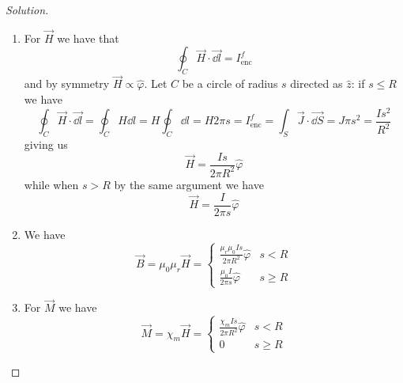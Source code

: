\documentclass[12pt]{extarticle}
\begin{document}
\begin{proof}[Solution]

    \skiplineafterproof
    \begin{enumerate}
        \item
              For $\vec H$ we have that
              \begin{equation}
                  \oint_C \vec H \cdot \vec{\dd l} = I_\text{enc}^f
              \end{equation}
              and by symmetry $\vec H \propto \hat \varphi$.
              Let $C$ be a circle of radius $s$ directed as $\hat z$: if $s \leq R$ we have
              \begin{equation}
                  \oint_C \vec H \cdot \vec{\dd l} = \oint_C H \dd l = H \oint_C \dd l = H 2 \pi s = I_\text{enc}^f = \int_S \vec J \cdot \vec{\dd S} = J \pi s^2 = \frac{I s^2}{R^2}
              \end{equation}
              giving us
              \begin{equation}
                  \vec H = \frac{Is}{2 \pi R^2} \hat \varphi
              \end{equation}
              while when $s > R$ by the same argument we have
              \begin{equation}
                  \vec H = \frac{I}{2 \pi s} \hat \varphi
              \end{equation}

        \item We have
              \begin{equation}
                  \vec B = \mu_0 \mu_r \vec H = \begin{cases}
                      \frac{\mu_r \mu_0 Is}{2 \pi R^2} \hat \varphi & s < R    \\
                      \frac{\mu_0 I}{2 \pi s} \hat \varphi          & s \geq R
                  \end{cases}
              \end{equation}

        \item For $\vec M$ we have
              \begin{equation}
                  \vec M = \chi_m \vec H = \begin{cases}
                      \frac{\chi_m Is}{2 \pi R^2} \hat \varphi & s < R    \\
                      0                                        & s \geq R
                  \end{cases}
              \end{equation}


\end{enumerate}
\end{proof}
\end{document}
